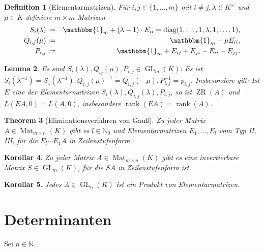 \documentclass[ngerman,a4paper]{report}
\theoremstyle{changebreak}
\newtheorem{theorem}{Theorem}[section]
\newtheorem{corollar}[theorem]{Korollar}
\newtheorem{lemma}[theorem]{Lemma}
\newtheorem{definition}[theorem]{Definition}
\DeclareMathOperator{\Mat}{Mat}
\DeclareMathOperator{\diag}{diag}
\DeclareMathOperator{\GL}{GL}
\DeclareMathOperator{\rk}{rank}
\DeclareMathOperator{\ZR}{ZR}
\begin{document}
\begin{definition}[Elementarmatrizen]
    Für $i,j \in \{1,\dots,m\}$ mit $i\neq j, \lambda\in K^{\times}$ und $\mu \in K$ definiere $m\times m$-Matrizen
    \begin{eqnarray*}
        S_i(\lambda) &:=& \mathbbm{1}_m +(\lambda -1)\cdot E_{ii} = \diag(1,\dots,1,\lambda,1,\dots,1),\\
            Q_{i,j}(\mu) &:=& \mathbbm{1}_m + \mu E_{ii},\\
            P_{i,j} &:=& \mathbbm{1}_m + E_{ij} + E_{ji} - E_{ii} - E_{jj}.
    \end{eqnarray*}
\end{definition}

\begin{lemma}
    Es sind $S_i(\lambda), Q_{ij}(\mu), P_{i,j}\in \GL_m(K)$: Es ist $S_i(\lambda^{-1})=S_{1}(\lambda^{-1}), Q_{i,j}(\mu)^{-1} = Q_{i,j}(-\mu),P_{i,j}^{-1}=p_{i,j}$. Insbesondere gilt: Ist $E$ eine der Elementarmatrizen $S_i(\lambda), Q_{i,j}(\lambda),P_{i,j}$, so ist $\ZR(A)$ und $L(EA,0) = L(A,0)$, insbesondere $\rk(EA)=\rk(A)$.
\end{lemma}

\begin{theorem}[Eliminationsverfahren von Gauß]
    Zu jeder Matrix $A\in \Mat_{m\times n}(K)$ gibt es $l \in \mathbb{N}_{0}$ und Elementarmatrizen $E_1,\dots,E_l$ vom Typ II, III, für die $E_l\cdots E_1 A$ in Zeilenstufenform.
\end{theorem}

\addtocounter{theorem}{1}

\begin{corollar}
    Zu jeder Matrix $A\in \Mat_{m\times n}(K)$ gibt es eine invertierbare Matrix $S\in \GL_m(K)$, für die $SA$ in Zeilenstufenform ist.
\end{corollar}

\addtocounter{theorem}{1}

\begin{corollar}
    Jedes $A\in \GL_n(K)$ ist ein Produkt von Elementarmatrizen.
\end{corollar}

\chapter{Determinanten}%
Sei $n \in \mathbb{N}$.

\addtocounter{section}{1}
\end{document}
